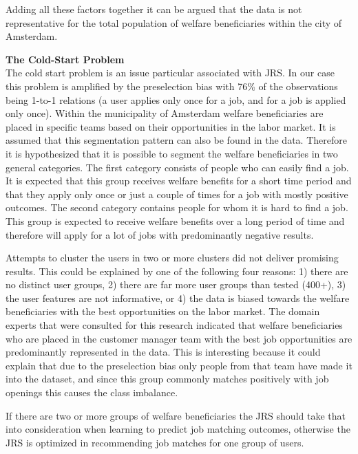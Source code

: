 Adding all these factors together it can be argued that the data is not representative for the total population of welfare beneficiaries within the city of Amsterdam. 

\noindent
\textbf{The Cold-Start Problem}\\
The cold start problem is an issue particular associated with JRS. In our case this problem is amplified by the preselection bias with 76\% of the observations being 1-to-1 relations (a user applies only once for a job, and for a job is applied only once). 
Within the municipality of Amsterdam welfare beneficiaries are placed in specific teams based on their opportunities in the labor market.
It is assumed that this segmentation pattern can also be found in the data.
Therefore it is hypothesized that it is possible to segment the welfare beneficiaries in two general categories.
The first category consists of people who can easily find a job. 
It is expected that this group receives welfare benefits for a short time period and that they apply only once or just a couple of times for a job with mostly positive outcomes. 
The second category contains people for whom it is hard to find a job. 
This group is expected to receive welfare benefits over a long period of time and therefore will apply for a lot of jobs with predominantly negative results.

Attempts to cluster the users in two or more clusters did not deliver promising results.
This could be explained by one of the following four reasons: 1) there are no distinct user groups, 2) there are far more user groups than tested (400+), 3) the user features are not informative, or 4) the data is biased towards the welfare beneficiaries with the best opportunities on the labor market.
The domain experts that were consulted for this research indicated that welfare beneficiaries who are placed in the customer manager team with the best job opportunities are predominantly represented in the data.  
This is interesting because it could explain that due to the preselection bias only people from that team have made it into the dataset, and since this group commonly matches positively with job openings this causes the class imbalance.

If there are two or more groups of welfare beneficiaries the JRS should take that into consideration when learning to predict job matching outcomes, otherwise the JRS is optimized in recommending job matches for one group of users.


